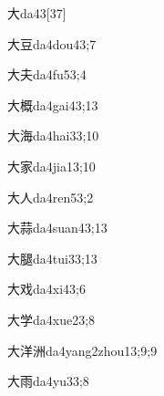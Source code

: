 \begin{verbete}{大}{da4}{3}[37]
\end{verbete}

\begin{verbete}{大豆}{da4dou4}{3;7}
\end{verbete}

\begin{verbete}{大夫}{da4fu5}{3;4}
\end{verbete}

\begin{verbete}{大概}{da4gai4}{3;13}
\end{verbete}

\begin{verbete}{大海}{da4hai3}{3;10}
\end{verbete}

\begin{verbete}{大家}{da4jia1}{3;10}
\end{verbete}

\begin{verbete}{大人}{da4ren5}{3;2}
\end{verbete}

\begin{verbete}{大蒜}{da4suan4}{3;13}
\end{verbete}

\begin{verbete}{大腿}{da4tui3}{3;13}
\end{verbete}

\begin{verbete}{大戏}{da4xi4}{3;6}
\end{verbete}

\begin{verbete}{大学}{da4xue2}{3;8}
\end{verbete}

\begin{verbete}{大洋洲}{da4yang2zhou1}{3;9;9}
\end{verbete}

\begin{verbete}{大雨}{da4yu3}{3;8}
\end{verbete}

